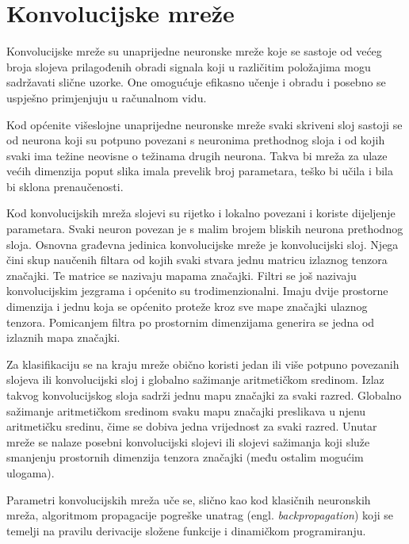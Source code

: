 \documentclass[utf8, seminar, numeric, lmodern]{feri}
\begin{document}
\chapter{Konvolucijske mreže} \label{chap:konv-nn}
Konvolucijske mreže su unaprijedne neuronske mreže koje se sastoje od većeg broja slojeva prilagođenih obradi signala koji u različitim položajima mogu sadržavati slične uzorke. One omogućuje efikasno učenje i obradu i posebno se uspješno primjenjuju u računalnom vidu.

Kod općenite višeslojne unaprijedne neuronske mreže svaki skriveni sloj sastoji se od neurona koji su potpuno povezani s neuronima prethodnog sloja i od kojih svaki ima težine neovisne o težinama drugih neurona. Takva bi mreža za ulaze većih dimenzija poput slika imala prevelik broj parametara, teško bi učila i bila bi sklona prenaučenosti. 

Kod konvolucijskih mreža slojevi su rijetko i lokalno povezani i koriste dijeljenje parametara. Svaki neuron povezan je s malim brojem bliskih neurona prethodnog sloja. Osnovna građevna jedinica konvolucijske mreže je konvolucijski sloj. Njega čini skup naučenih filtara od kojih svaki stvara jednu matricu izlaznog tenzora značajki. Te matrice se nazivaju mapama značajki. Filtri se još nazivaju konvolucijskim jezgrama i općenito su trodimenzionalni. Imaju dvije prostorne dimenzija i jednu koja se općenito proteže kroz sve mape značajki ulaznog tenzora. Pomicanjem filtra po prostornim dimenzijama generira se jedna od izlaznih mapa značajki.

Za klasifikaciju se na kraju mreže obično koristi jedan ili više potpuno povezanih slojeva ili konvolucijski sloj i globalno sažimanje aritmetičkom sredinom. Izlaz takvog konvolucijskog sloja sadrži jednu mapu značajki za svaki razred. Globalno sažimanje aritmetičkom sredinom svaku mapu značajki preslikava u njenu aritmetičku sredinu, čime se dobiva jedna vrijednost za svaki razred. Unutar mreže se nalaze posebni konvolucijski slojevi ili slojevi sažimanja koji služe smanjenju prostornih dimenzija tenzora značajki (među ostalim mogućim ulogama).

Parametri konvolucijskih mreža uče se, slično kao kod klasičnih neuronskih mreža, algoritmom propagacije pogreške unatrag (engl. \emph{backpropagation}) koji se temelji na pravilu derivacije složene funkcije i dinamičkom programiranju.
\end{document}
